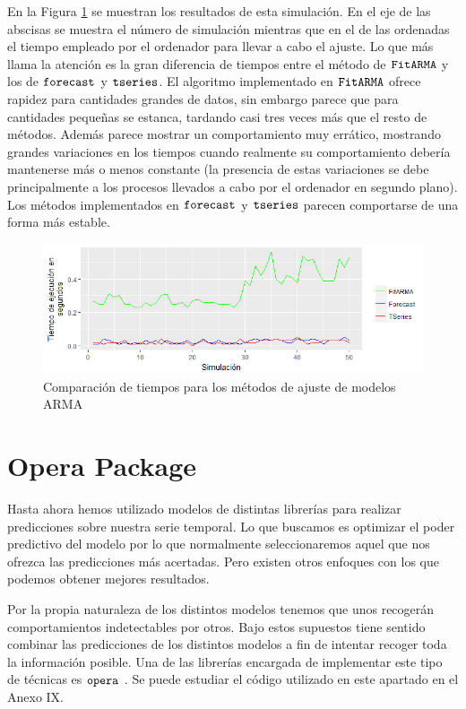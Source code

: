En la Figura \ref{tiempos_modelos} se muestran los resultados de esta simulación. En el eje de las abscisas se muestra el número de simulación mientras que en el de las ordenadas el tiempo empleado por el ordenador para llevar a cabo el ajuste. Lo que más llama la atención es la gran diferencia de tiempos entre el método de $\verb!FitARMA!$ y los de $\verb!forecast!$ y $\verb!tseries!$. El algoritmo implementado en $\verb!FitARMA!$ ofrece rapidez para cantidades grandes de datos, sin embargo parece que para cantidades pequeñas se estanca, tardando casi tres veces más que el resto de métodos. Además parece mostrar un comportamiento muy errático, mostrando grandes variaciones en los tiempos cuando realmente su comportamiento debería mantenerse más o menos constante (la presencia de estas variaciones se debe principalmente a los procesos llevados a cabo por el ordenador en segundo plano). Los métodos implementados en $\verb!forecast!$ y $\verb!tseries!$ parecen comportarse de una forma más estable.
\begin{figure}
    \centering
    \centerline{\includegraphics[scale = 0.7]{Images/Modelizacion/331.png}}
    \caption{Comparación de tiempos para los métodos de ajuste de modelos ARMA}
    \label{tiempos_modelos}
\end{figure}

\section{Opera Package}
Hasta ahora hemos utilizado modelos de distintas librerías para realizar predicciones sobre nuestra serie temporal. Lo que buscamos es optimizar el poder predictivo del modelo por lo que normalmente seleccionaremos aquel que nos ofrezca las predicciones más acertadas. Pero existen otros enfoques con los que podemos obtener mejores resultados.

Por la propia naturaleza de los distintos modelos tenemos que unos recogerán comportamientos indetectables por otros. Bajo estos supuestos tiene sentido combinar las predicciones de los distintos modelos a fin de intentar recoger toda la información posible. Una de las librerías encargada de implementar este tipo de técnicas es $\verb!opera!$ \cite{opera}. Se puede estudiar el código utilizado en este apartado en el Anexo IX.

